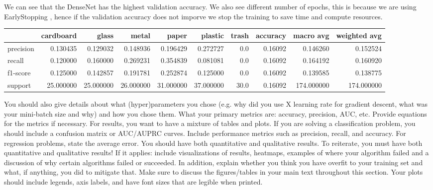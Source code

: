 \documentclass{article}
\begin{document}
We can see that the DenseNet has the highest validation accuracy. We also see different number of epochs, this is because we are using EarlyStopping \cite{geron2019hands}, hence if the validation accuracy does not imporve we stop the training to save time and compute resources. 


\begin{tabular}{lrrrrrrrrr}
\toprule{} &  cardboard &      glass &      metal &      paper &    plastic &  trash &  accuracy &   macro avg &  weighted avg \\
\midrule
precision &   0.130435 &   0.129032 &   0.148936 &   0.196429 &   0.272727 &    0.0 &   0.16092 &    0.146260 &      0.152524 \\
recall    &   0.120000 &   0.160000 &   0.269231 &   0.354839 &   0.081081 &    0.0 &   0.16092 &    0.164192 &      0.160920 \\
f1-score  &   0.125000 &   0.142857 &   0.191781 &   0.252874 &   0.125000 &    0.0 &   0.16092 &    0.139585 &      0.138775 \\
support   &  25.000000 &  25.000000 &  26.000000 &  31.000000 &  37.000000 &   30.0 &   0.16092 &  174.000000 &    174.000000 \\
\bottomrule
\end{tabular}

You should also give details about what (hyper)parameters you chose (e.g. why did you
use X learning rate for gradient descent, what was your mini-batch size and why) and how
you chose them. What your primary metrics are: accuracy, precision,
AUC, etc. Provide equations for the metrics if necessary. For results, you want to have a
mixture of tables and plots. If you are solving a classification problem, you should include a
confusion matrix or AUC/AUPRC curves. Include performance metrics such as precision,
recall, and accuracy. For regression problems, state the average error. You should have
both quantitative and qualitative results. To reiterate, you must have both quantitative
and qualitative results! If it applies: include visualizations of results, heatmaps,
examples of where your algorithm failed and a discussion of why certain algorithms failed
or succeeded. In addition, explain whether you think you have overfit to your training set
and what, if anything, you did to mitigate that. Make sure to discuss the figures/tables in
your main text throughout this section. Your plots should include legends, axis labels, and
have font sizes that are legible when printed.
\end{document}
